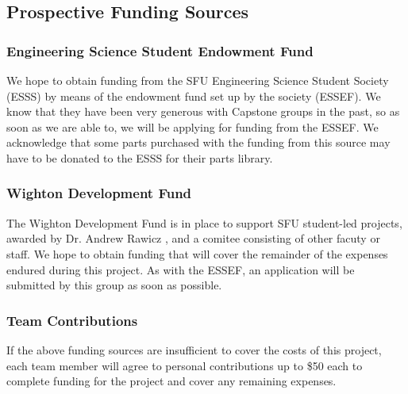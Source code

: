 \pagebreak
\subsection{Prospective Funding Sources}
\medskip
\subsubsection{Engineering Science Student Endowment Fund}
\medskip
We hope to obtain funding from the SFU Engineering Science Student Society (\Gls{ESSS}) by means of the endowment fund set up by the society (ESSEF). We know that they have been very generous with Capstone groups in the past, so as soon as we are able to, we will be applying for funding from the ESSEF. We acknowledge that some parts purchased with the funding from this source may have to be donated to the ESSS for their parts library.

\subsubsection{Wighton Development Fund}
\medskip
The Wighton Development Fund is in place to support SFU student-led projects, awarded by Dr. Andrew Rawicz \cite{R4-1}, and a comitee consisting of other facuty or staff. We hope to obtain funding that will cover the remainder of the expenses endured during this project. As with the ESSEF, an application will be submitted by this group as soon as possible.

\subsubsection{Team Contributions}
\medskip
If the above funding sources are insufficient to cover the costs of this project, each team member will agree to personal contributions up to \$50 each to complete funding for the project and cover any remaining expenses.




